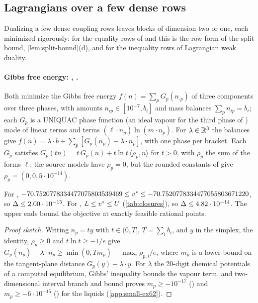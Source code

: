 \subsection{Lagrangians over a few dense rows}\label{sec:other-dense}

Dualizing a few dense coupling rows leaves blocks of dimension two or one, each minimized rigorously: for the equality rows of  and  this is the row form of the split bound, \cref{lem:split-bound}(d), and for the inequality rows of  Lagrangian weak duality.

\paragraph{Gibbs free energy: , .}
Both minimize the Gibbs free energy $f(n)=\sum_pG_p(n_{\cdot p})$ of three components over three phases, with amounts $n_{ip}\in[10^{-7},b_i]$ and mass balances $\sum_pn_{ip}=b_i$; each $G_p$ is a UNIQUAC phase function (an ideal vapour for the third phase of ) made of linear terms and terms $(\ell\cdot n_p)\ln(m\cdot n_p)$.
For $\lambda\in\mathbb{R}^3$ the balances give $f(n)=\lambda\cdot b+\sum_p[G_p(n_p)-\lambda\cdot n_p]$, with one phase per bracket.
Each $G_p$ satisfies $G_p(tn)=t\,G_p(n)+t\ln t\,\langle\rho_p,n\rangle$ for $t>0$, with $\rho_p$ the sum of the forms $\ell$; the source models have $\rho_p=0$, but the rounded constants of  give $\rho_p=(0,0,5\cdot10^{-14})$.

\begin{theorem}\label{thm:ex62-bounds}
For , $-70.7520778334477075803539469\le v^{*}\le-70.7520778334477055803671220$, so $\Delta\le2.00\cdot10^{-15}$.
For , $L\le v^{*}\le U$ (\cref{tab:closures}), so $\Delta\le4.82\cdot10^{-14}$.
The upper ends bound the objective at exactly feasible rational points.
\end{theorem}

\begin{proof}[Proof sketch]
Writing $n_p=ty$ with $t\in(0,T]$, $T=\sum_ib_i$, and $y$ in the simplex, the identity, $\rho_p\ge0$ and $t\ln t\ge-1/e$ give $G_p(n_p)-\lambda\cdot n_p\ge\min(0,Tm_p)-\max_i\rho_{p,i}/e$, where $m_p$ is a lower bound on the tangent-plane distance $G_p(y)-\lambda\cdot y$.
For $\lambda$ the 20-digit chemical potentials of a computed equilibrium, Gibbs' inequality bounds the vapour term, and two-dimensional interval branch and bound proves $m_p\ge-10^{-17}$ () and $m_p\ge-6\cdot10^{-15}$ () for the liquids (\cref{app:small-ex62}).
\end{proof}

